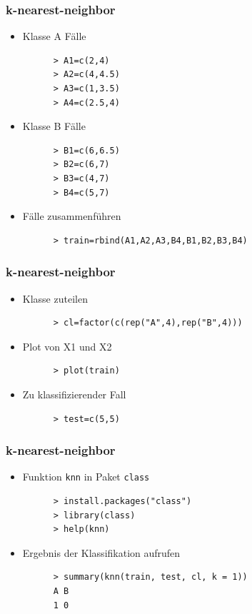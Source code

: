 \documentclass{beamer}
\begin{document}
\begin{frame}[fragile]
  \frametitle{k-nearest-neighbor}
  \begin{itemize}
    \item Klasse A Fälle
    \begin{Verbatim}
      > A1=c(2,4)
      > A2=c(4,4.5)
      > A3=c(1,3.5)
      > A4=c(2.5,4)
    \end{Verbatim}
     \item Klasse B Fälle
    \begin{Verbatim}
      > B1=c(6,6.5)
      > B2=c(6,7)
      > B3=c(4,7)
      > B4=c(5,7)
    \end{Verbatim}  
    \item Fälle zusammenführen
        \begin{Verbatim}
      > train=rbind(A1,A2,A3,B4,B1,B2,B3,B4) 
        \end{Verbatim}  
  \end{itemize}
\end{frame}

\begin{frame}[fragile]
  \frametitle{k-nearest-neighbor}
  \begin{itemize}
     \item Klasse zuteilen
    \begin{Verbatim}
      > cl=factor(c(rep("A",4),rep("B",4)))
    \end{Verbatim}
      \item Plot von X1 und X2
    \begin{Verbatim}
      > plot(train)
    \end{Verbatim}
          \item Zu klassifizierender Fall
    \begin{Verbatim}
      > test=c(5,5)
    \end{Verbatim}
  \end{itemize}
\end{frame}

\begin{frame}[fragile]
  \frametitle{k-nearest-neighbor}
  \begin{itemize}
    \item Funktion \Verb+knn+ in Paket \Verb+class+
    \begin{Verbatim}
      > install.packages("class")
      > library(class)
      > help(knn)
    \end{Verbatim}
     \item Ergebnis der Klassifikation aufrufen
    \begin{Verbatim}
      > summary(knn(train, test, cl, k = 1))
      A B
      1 0
    \end{Verbatim}       
  \end{itemize}
\end{frame}
\end{document}
